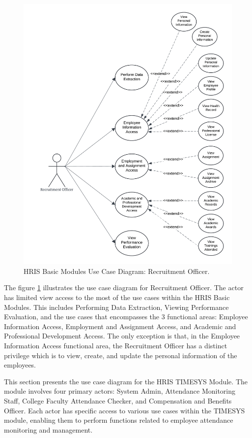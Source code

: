     \begin{figure}[H]
        \centering
        \includegraphics[width=0.9\linewidth]{figures/images/use-case-basic-8.png}
        \caption{HRIS Basic Modules Use Case Diagram: Recruitment Officer.}
        \label{fig:use-case-basic-8}
    \end{figure}

    The figure \ref{fig:use-case-basic-8} illustrates the use case diagram for Recruitment Officer. The actor has limited view access to the most of the use cases within the HRIS Basic Modules. This includes Performing Data Extraction, Viewing Performance Evaluation, and the use cases that  encompasses the 3 functional areas: Employee Information Access, Employment and Assignment Access, and Academic and Professional Development Access. The only exception is that,  in the Employee Information Access functional area, the Recruitment Officer has a distinct privilege which is to view, create, and update the personal information of the employees.


    This section presents the use case diagram for the HRIS TIMESYS Module. The module involves four primary actors: System Admin, Attendance Monitoring Staff, College Faculty Attendance Checker, and Compensation and Benefits Officer. Each actor has specific access to various use cases within the TIMESYS module, enabling them to perform functions related to employee attendance monitoring and management.

